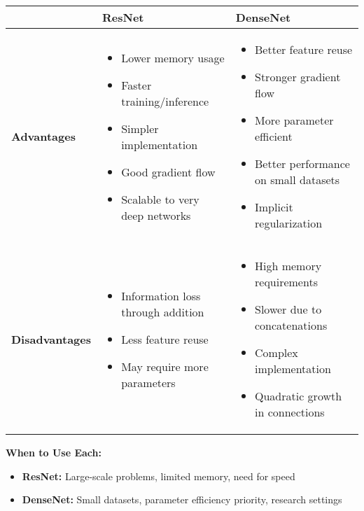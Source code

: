 \documentclass[12pt]{article}
\begin{document}
\begin{enumerate}[(a)]
{    \begin{tabular}{|p{2.5cm}|p{5cm}|p{5cm}|}
    \hline
    & \textbf{ResNet} & \textbf{DenseNet} \\
    \hline
    \textbf{Advantages} & 
    \begin{itemize}
        \item Lower memory usage
        \item Faster training/inference
        \item Simpler implementation
        \item Good gradient flow
        \item Scalable to very deep networks
    \end{itemize} & 
    \begin{itemize}
        \item Better feature reuse
        \item Stronger gradient flow
        \item More parameter efficient
        \item Better performance on small datasets
        \item Implicit regularization
    \end{itemize} \\
    \hline
    \textbf{Disadvantages} & 
    \begin{itemize}
        \item Information loss through addition
        \item Less feature reuse
        \item May require more parameters
    \end{itemize} & 
    \begin{itemize}
        \item High memory requirements
        \item Slower due to concatenations
        \item Complex implementation
        \item Quadratic growth in connections
    \end{itemize} \\
    \hline
    \end{tabular}
    
    \textbf{When to Use Each:}
    \begin{itemize}
        \item \textbf{ResNet:} Large-scale problems, limited memory, need for speed
        \item \textbf{DenseNet:} Small datasets, parameter efficiency priority, research settings
    \end{itemize}
    }
    

\end{enumerate}
\end{document}
